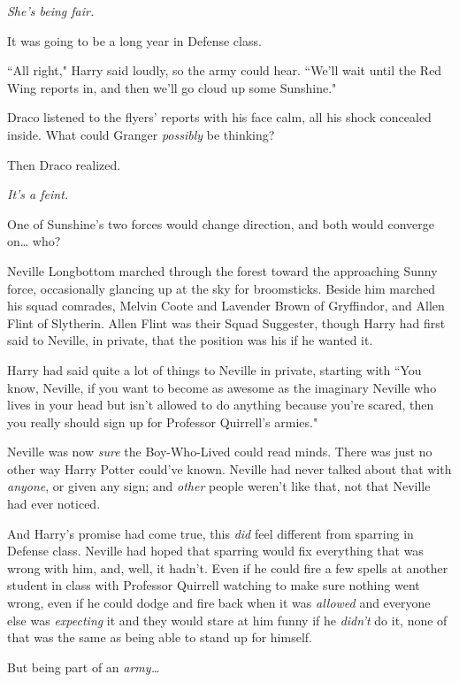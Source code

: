 \emph{She's being fair.}

It was going to be a long year in Defense class.

``All right," Harry said loudly, so the army could hear. ``We'll wait until the Red Wing reports in, and then we'll go cloud up some Sunshine."

\later

Draco listened to the flyers' reports with his face calm, all his shock concealed inside. What could Granger \emph{possibly} be thinking?

Then Draco realized.

\emph{It's a feint.}

One of Sunshine's two forces would change direction, and both would converge on{\ldots} who?

\later

Neville Longbottom marched through the forest toward the approaching Sunny force, occasionally glancing up at the sky for broomsticks. Beside him marched his squad comrades, Melvin Coote and Lavender Brown of Gryffindor, and Allen Flint of Slytherin. Allen Flint was their Squad Suggester, though Harry had first said to Neville, in private, that the position was his if he wanted it.

Harry had said quite a lot of things to Neville in private, starting with ``You know, Neville, if you want to become as awesome as the imaginary Neville who lives in your head but isn't allowed to do anything because you're scared, then you really should sign up for Professor Quirrell's armies."

Neville was now \emph{sure} the Boy-Who-Lived could read minds. There was just no other way Harry Potter could've known. Neville had never talked about that with \emph{anyone}, or given any sign; and \emph{other} people weren't like that, not that Neville had ever noticed.

And Harry's promise had come true, this \emph{did} feel different from sparring in Defense class. Neville had hoped that sparring would fix everything that was wrong with him, and, well, it hadn't. Even if he could fire a few spells at another student in class with Professor Quirrell watching to make sure nothing went wrong, even if he could dodge and fire back when it was \emph{allowed} and everyone else was \emph{expecting} it and they would stare at him funny if he \emph{didn't} do it, none of that was the same as being able to stand up for himself.

But being part of an \emph{army{\ldots}}

